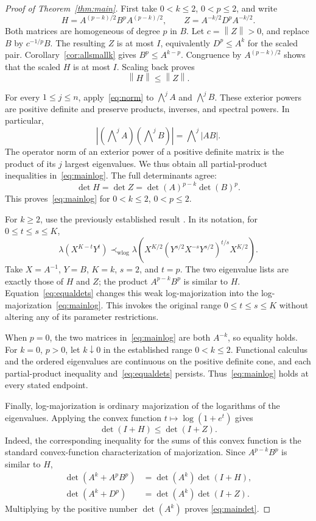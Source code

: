 \documentclass[11pt,a4paper]{article}
\theoremstyle{remark}
\newcommand{\norm}[1]{\left\lVert #1\right\rVert}
\begin{document}
\begin{proof}[Proof of Theorem~\ref{thm:main}]
First take \(0<k\le2\), \(0<p\le2\), and write
\[
 H=A^{(p-k)/2}B^pA^{(p-k)/2},\qquad
 Z=A^{-k/2}D^pA^{-k/2}.
\]
Both matrices are homogeneous of degree \(p\) in \(B\).
Let \(c=\norm{Z}>0\), and replace \(B\) by \(c^{-1/p}B\).
The resulting \(Z\) is at most \(I\), equivalently
\(D^p\le A^k\) for the scaled pair.
Corollary~\ref{cor:allsmallk} gives \(B^p\le A^{k-p}\).
Congruence by \(A^{(p-k)/2}\) shows that the scaled \(H\) is
at most \(I\). Scaling back proves
\begin{equation}\label{eq:norm}
 \norm{H}\le\norm{Z}.
\end{equation}

For every \(1\le j\le n\), apply~\eqref{eq:norm} to
\(\bigwedge^j A\) and \(\bigwedge^j B\).
These exterior powers are positive definite and preserve products,
inverses, and spectral powers. In particular,
\[
 \left|(\bigwedge\nolimits^j A)(\bigwedge\nolimits^j B)\right|
 =\bigwedge\nolimits^j |AB|.
\]
The operator norm of an exterior power of a positive definite matrix
is the product of its \(j\) largest eigenvalues. We thus obtain
all partial-product inequalities in~\eqref{eq:mainlog}.
The full determinants agree:
\begin{equation}\label{eq:equaldets}
 \det H=\det Z=\det(A)^{p-k}\det(B)^p.
\end{equation}
This proves~\eqref{eq:mainlog} for \(0<k\le2\), \(0<p\le2\).

For \(k\ge2\), use the previously established result
\cite[Lemma~2.5]{GAMA20}. In its notation, for \(0\le t\le s\le K\),
\[
 \lambda(X^{K-t}Y^t)
 \prec_{\mathrm{wlog}}
 \lambda\!\left(
 X^{K/2}(Y^{s/2}X^{-s}Y^{s/2})^{t/s}X^{K/2}\right).
\]
Take \(X=A^{-1}\), \(Y=B\), \(K=k\), \(s=2\), and \(t=p\).
The two eigenvalue lists are exactly those of \(H\) and \(Z\);
the product \(A^{p-k}B^p\) is similar to \(H\).
Equation~\eqref{eq:equaldets} changes this weak log-majorization
into the log-majorization~\eqref{eq:mainlog}.
This invokes the original range \(0\le t\le s\le K\) without
altering any of its parameter restrictions.

When \(p=0\), the two matrices in~\eqref{eq:mainlog} are both
\(A^{-k}\), so equality holds.
For \(k=0\), \(p>0\), let \(k\downarrow0\) in the established
range \(0<k\le2\). Functional calculus and the ordered eigenvalues
are continuous on the positive definite cone, and each
partial-product inequality and~\eqref{eq:equaldets} persists.
Thus~\eqref{eq:mainlog} holds at every stated endpoint.

Finally, log-majorization is ordinary majorization of the logarithms
of the eigenvalues. Applying the convex function
\(t\mapsto\log(1+e^t)\) gives
\[
 \det(I+H)\le\det(I+Z).
\]
Indeed, the corresponding inequality for the sums of this convex
function is the standard convex-function characterization of
majorization. Since \(A^{p-k}B^p\) is similar to \(H\),
\begin{align*}
 \det(A^k+A^pB^p)&=\det(A^k)\det(I+H),\\
 \det(A^k+D^p)&=\det(A^k)\det(I+Z).
\end{align*}
Multiplying by the positive number \(\det(A^k)\) proves
\eqref{eq:maindet}.
\end{proof}
\end{document}
